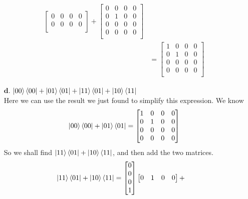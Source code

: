 \documentclass[11pt]{article}
\begin{document}
\begin{enumerate}
\begin{align*}
\begin{bmatrix}
                0 & 0 & 0 & 0 \\
                0 & 0 & 0 & 0 \\
         \end{bmatrix}
            + 
            \begin{bmatrix}
                0 & 0 & 0 & 0 \\
                0 & 1 & 0 & 0 \\
                0 & 0 & 0 & 0 \\
                0 & 0 & 0 & 0 \\
            \end{bmatrix} \\
        &= \begin{bmatrix}
                1 & 0 & 0 & 0 \\
                0 & 1 & 0 & 0 \\
                0 & 0 & 0 & 0 \\
                0 & 0 & 0 & 0 \\
            \end{bmatrix} 
        \end{align*}
    \item[$\textbf{d.}$] $\ket{00}\bra{00} + \ket{01}\bra{01} + \ket{11}\bra{01} + 
        \ket{10}\bra{11}$ \\
        Here we can use the result we just found to simplify this expression. 
        We know  $$\ket{00}\bra{00} + \ket{01}\bra{01}
        = \begin{bmatrix}
                1 & 0 & 0 & 0 \\
                0 & 1 & 0 & 0 \\
                0 & 0 & 0 & 0 \\
                0 & 0 & 0 & 0 \\
            \end{bmatrix}$$
        So we shall find  $\ket{11}\bra{01} + \ket{10}\bra{11}$, 
        and then add the two matrices.
        \begin{align*}
        \ket{11}\bra{01} + \ket{10}\bra{11}
            &= \begin{bmatrix}
                0 \\ 0 \\ 0 \\ 1
                \end{bmatrix}
                \begin{bmatrix}
                    0 & 1 & 0 & 0
                \end{bmatrix} + 

\end{align*}
\end{enumerate}
\end{document}
